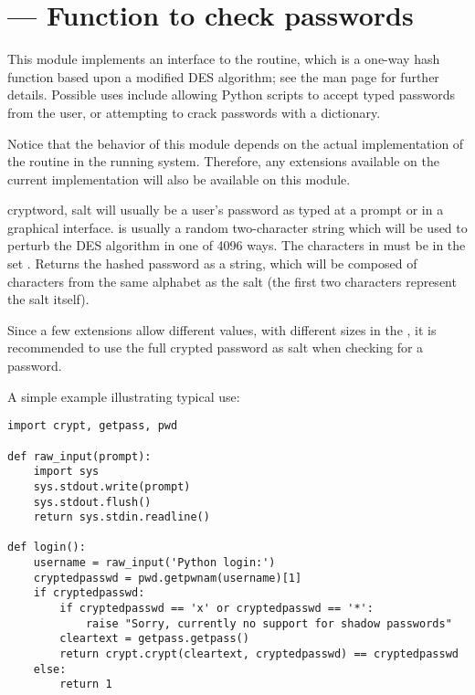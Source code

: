 \section{ ---
         Function to check \UNIX{} passwords}



This module implements an interface to the
 routine, which is a one-way hash
function based upon a modified DES algorithm; see
the \UNIX{} man page for further details.  Possible uses include
allowing Python scripts to accept typed passwords from the user, or
attempting to crack \UNIX{} passwords with a dictionary.

Notice that the behavior of this module depends on the actual implementation 
of the  routine in the running system. 
Therefore, any extensions available on the current implementation will also 
be available on this module.
\begin{funcdesc}{crypt}{word, salt} 
   will usually be a user's password as typed at a prompt or 
  in a graphical interface.   is usually a random
  two-character string which will be used to perturb the DES algorithm
  in one of 4096 ways.  The characters in  must be in the
  set \regexp{[./a-zA-Z0-9]}.  Returns the hashed password as a
  string, which will be composed of characters from the same alphabet
   as the salt (the first two characters represent the salt itself).

  Since a few  extensions allow different
  values, with different sizes in the , it is recommended to use 
  the full crypted password as salt when checking for a password.
\end{funcdesc}


A simple example illustrating typical use:

\begin{verbatim}
import crypt, getpass, pwd

def raw_input(prompt):
    import sys
    sys.stdout.write(prompt)
    sys.stdout.flush()
    return sys.stdin.readline()

def login():
    username = raw_input('Python login:')
    cryptedpasswd = pwd.getpwnam(username)[1]
    if cryptedpasswd:
        if cryptedpasswd == 'x' or cryptedpasswd == '*': 
            raise "Sorry, currently no support for shadow passwords"
        cleartext = getpass.getpass()
        return crypt.crypt(cleartext, cryptedpasswd) == cryptedpasswd
    else:
        return 1
\end{verbatim}
